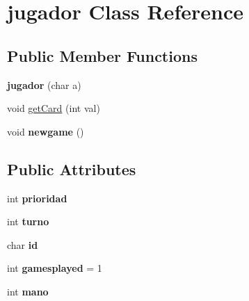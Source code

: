 \hypertarget{classjugador}{}\section{jugador Class Reference}
\label{classjugador}
\subsection*{Public Member Functions}
\begin{DoxyCompactItemize}
\item 
{\bfseries jugador} (char a)\hypertarget{classjugador_a25d95632b6507fea54bf39211defbeb1}{}\label{classjugador_a25d95632b6507fea54bf39211defbeb1}

\item 
void \hyperlink{classjugador_a94d2eaddaaac69ce42933c9da20d40e5}{get\+Card} (int val)
\item 
void {\bfseries newgame} ()\hypertarget{classjugador_ae53d4467dadfb8a2859d5effc297b379}{}\label{classjugador_ae53d4467dadfb8a2859d5effc297b379}

\end{DoxyCompactItemize}
\subsection*{Public Attributes}
\begin{DoxyCompactItemize}
\item 
int {\bfseries prioridad}\hypertarget{classjugador_add03bebbc4513e170e9d160b68997c1a}{}\label{classjugador_add03bebbc4513e170e9d160b68997c1a}

\item 
int {\bfseries turno}\hypertarget{classjugador_abcbba999526a05804771e5d293be99eb}{}\label{classjugador_abcbba999526a05804771e5d293be99eb}

\item 
char {\bfseries id}\hypertarget{classjugador_ae7d6670bc7f40ad6e3b38d08ceaba48e}{}\label{classjugador_ae7d6670bc7f40ad6e3b38d08ceaba48e}

\item 
int {\bfseries gamesplayed} = 1\hypertarget{classjugador_aa2cac18cba0d437ff37a86f5ae0f03db}{}\label{classjugador_aa2cac18cba0d437ff37a86f5ae0f03db}

\item 
int {\bfseries mano}\hypertarget{classjugador_a162a110311174ca3b5594580c7b44089}{}\label{classjugador_a162a110311174ca3b5594580c7b44089}

\end{DoxyCompactItemize}


